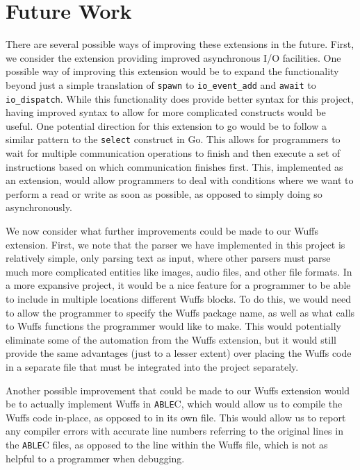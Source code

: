 \documentclass[main.tex]{subfiles}
\begin{document}
\section{Future Work}
There are several possible ways of improving these extensions in the future. First, we consider the extension
providing improved asynchronous I/O facilities. One possible way of improving this extension would be to expand
the functionality beyond just a simple translation of \verb|spawn| to \verb|io_event_add| and \verb|await| to 
\verb|io_dispatch|. While this functionality does provide better syntax for this project, having improved syntax to allow
for more complicated constructs would be useful. One potential direction for this extension to go would be to follow a
similar pattern to the \verb|select| construct in Go. This allows for programmers to wait for multiple communication
operations to finish and then execute a set of instructions based on which communication finishes first. This, 
implemented as an extension, would allow programmers to deal with conditions where we want to perform a read or
write as soon as possible, as opposed to simply doing so asynchronously.

We now consider what further improvements could be made to our Wuffs extension. First, we note that the parser
we have implemented in this project is relatively simple, only parsing text as input, where other parsers must parse
much more complicated entities like images, audio files, and other file formats. In a more expansive project, it would be
a nice feature for a programmer to be able to include in multiple locations different Wuffs blocks. To do this, we would
need to allow the programmer to specify the Wuffs package name, as well as what calls to Wuffs functions the
programmer would like to make. This would potentially eliminate some of the automation from the Wuffs extension,
but it would still provide the same advantages (just to a lesser extent) over placing the Wuffs code in a separate file that
must be integrated into the project separately.

Another possible improvement that could be made to our Wuffs extension would be to actually implement Wuffs in \verb|ABLE|C,
which would allow us to compile the Wuffs code in-place, as opposed to in its own file. This would allow us to report
any compiler errors with accurate line numbers referring to the original lines in the
\verb|ABLE|C files, as opposed to the line within the Wuffs file, which is not as helpful to a programmer when debugging.
\end{document}
